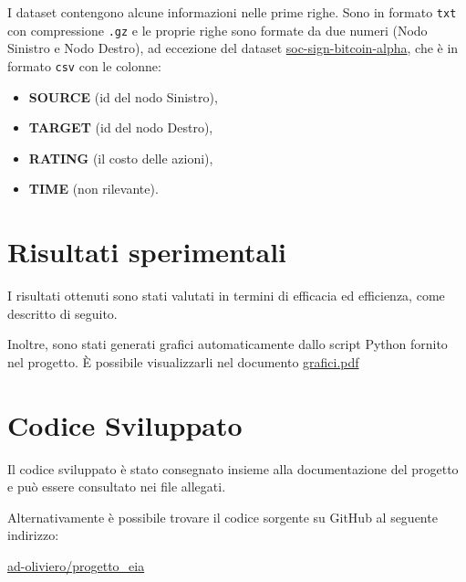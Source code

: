 \documentclass{article}
\begin{document}
I dataset contengono alcune informazioni nelle prime righe. Sono in formato \texttt{txt}
con compressione \texttt{.gz} e le proprie righe sono formate da due numeri (Nodo Sinistro
e Nodo Destro), ad eccezione del dataset
\href{https://snap.stanford.edu/data/soc-sign-bitcoin-alpha.html}{soc-sign-bitcoin-alpha},
che è in formato \texttt{csv} con le colonne:
\begin{itemize}
	\item \textbf{SOURCE} (id del nodo Sinistro),
	\item \textbf{TARGET} (id del nodo Destro),
	\item \textbf{RATING} (il costo delle azioni),
	\item \textbf{TIME} (non rilevante).
\end{itemize}

\section{Risultati sperimentali}
I risultati ottenuti sono stati valutati in termini di efficacia ed efficienza, come descritto di seguito.

Inoltre, sono stati generati grafici automaticamente dallo script Python fornito nel progetto.
È possibile visualizzarli nel documento \href{run:grafici.pdf}{grafici.pdf}




\section{Codice Sviluppato}
Il codice sviluppato è stato consegnato insieme alla documentazione del progetto e può essere consultato nei file allegati.

Alternativamente è possibile trovare il codice sorgente su GitHub al seguente indirizzo:

\href{https://github.com/ad-oliviero/progetto_eia}{ad-oliviero/progetto\_eia}

\newpage
\nocite{kumar2016edge,kumar2018rev2,jleskovec2009community,klimmt2004introducing,yang2012defining,leskovec2005graphs}
\printbibliography
\end{document}
